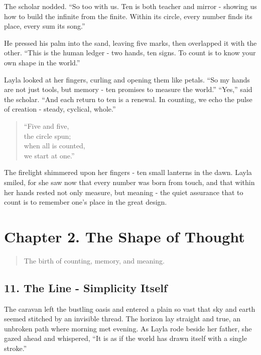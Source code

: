 \documentclass[
  letterpaper,
  DIV=11,
  numbers=noendperiod]{scrreprt}
\begin{document}
The scholar nodded. ``So too with us. Ten is both teacher and mirror -
showing us how to build the infinite from the finite. Within its circle,
every number finds its place, every sum its song.''

He pressed his palm into the sand, leaving five marks, then overlapped
it with the other. ``This is the human ledger - two hands, ten signs. To
count is to know your own shape in the world.''

Layla looked at her fingers, curling and opening them like petals. ``So
my hands are not just tools, but memory - ten promises to measure the
world.'' ``Yes,'' said the scholar. ``And each return to ten is a
renewal. In counting, we echo the pulse of creation - steady, cyclical,
whole.''

\begin{quote}
``Five and five,\\
the circle spun;\\
when all is counted,\\
we start at one.''
\end{quote}

The firelight shimmered upon her fingers - ten small lanterns in the
dawn. Layla smiled, for she saw now that every number was born from
touch, and that within her hands rested not only measure, but meaning -
the quiet assurance that to count is to remember one's place in the
great design.

\section{Chapter 2. The Shape of
Thought}\label{chapter-2.-the-shape-of-thought}

\begin{quote}
The birth of counting, memory, and meaning.
\end{quote}

\subsection{11. The Line - Simplicity
Itself}\label{the-line---simplicity-itself}

The caravan left the bustling oasis and entered a plain so vast that sky
and earth seemed stitched by an invisible thread. The horizon lay
straight and true, an unbroken path where morning met evening. As Layla
rode beside her father, she gazed ahead and whispered, ``It is as if the
world has drawn itself with a single stroke.''
\end{document}
